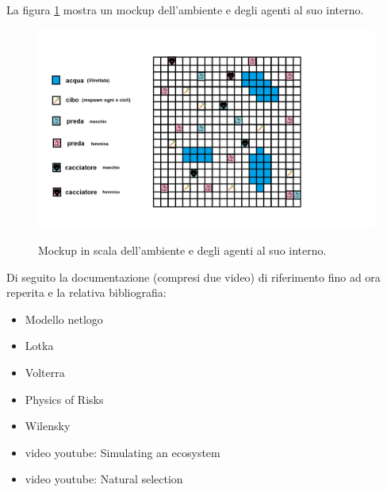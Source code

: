 \documentclass{article}
\begin{document}
La figura \ref{fig1} mostra un mockup dell'ambiente e degli agenti al suo interno. 
\begin{figure}[h]
    \centering
    \includegraphics[scale = 0.4]{mockup.png}
    \label{fig1}
    \caption{Mockup in scala dell'ambiente e degli agenti al suo interno.}
\end{figure}

\newpage

Di seguito la documentazione (compresi due video) di riferimento fino ad ora reperita e la relativa bibliografia: 
\begin{itemize}
    \item Modello netlogo \cite{NetLogoModel} 
    \item  Lotka \cite{Lotka}
    \item Volterra \cite{Volterra}
    \item Physics of Risks \cite{PhysicsofRisk}
    \item Wilensky \cite{Wilensky}
    \item video youtube: Simulating an ecosystem \cite{YTVideo1}
    
     \item video youtube: Natural selection \cite{YTVideo2}
\end{itemize}


\medskip
\printbibliography	
\end{document}
